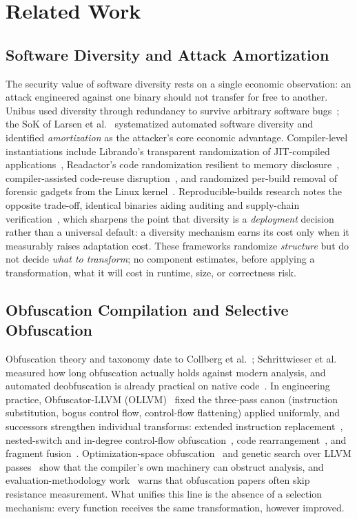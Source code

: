 \documentclass[5p,times,authoryear]{elsarticle}
\theoremstyle{plain}
\theoremstyle{definition}
\theoremstyle{remark}
\begin{document}
\section{Related Work}

\subsection{Software Diversity and Attack Amortization}

The security value of software diversity rests on a single economic observation: an
attack engineered against one binary should not transfer for free to another. Unibus
used diversity through redundancy to survive arbitrary software
bugs~\cite{franz2010unibus}; the SoK of Larsen et al.~\cite{bib2} systematized
automated software diversity and identified \emph{amortization} as the attacker's core
economic advantage. Compiler-level instantiations include Librando's transparent
randomization of JIT-compiled applications~\cite{homescu2013librando}, Readactor's code
randomization resilient to memory disclosure~\cite{crane2015readactor},
compiler-assisted code-reuse disruption~\cite{koo2018ccr}, and randomized per-build
removal of forensic gadgets from the Linux kernel~\cite{franzen2023randcompile}.
Reproducible-builds research notes the opposite trade-off, identical binaries aiding
auditing and supply-chain verification~\cite{fourn2023reproducible}, which sharpens the
point that diversity is a \emph{deployment} decision rather than a universal default:
a diversity mechanism earns its cost only when it measurably raises adaptation cost.
These frameworks randomize \emph{structure} but do not decide \emph{what to
transform}; no component estimates, before applying a transformation, what it will
cost in runtime, size, or correctness risk.

\subsection{Obfuscation Compilation and Selective Obfuscation}

Obfuscation theory and taxonomy date to Collberg et al.~\cite{bib6};
Schrittwieser et al.~\cite{bib7} measured how long obfuscation actually holds against
modern analysis, and automated deobfuscation is already practical on native
code~\cite{bib5}. In engineering practice, Obfuscator-LLVM (OLLVM)~\cite{bib8} fixed
the three-pass canon (instruction substitution, bogus control flow, control-flow
flattening) applied uniformly, and successors strengthen individual transforms:
extended instruction replacement~\cite{bib9}, nested-switch and in-degree control-flow
obfuscation~\cite{bib10}, code rearrangement~\cite{bib11}, and fragment
fusion~\cite{bib12}. Optimization-space obfuscation~\cite{bib13} and genetic
search over LLVM passes~\cite{bib14} show that the compiler's own machinery can
obstruct analysis, and evaluation-methodology work~\cite{bib15} warns that
obfuscation papers often skip resistance measurement. What unifies this line is the
absence of a selection mechanism: every function receives the same transformation,
however improved.
\end{document}
